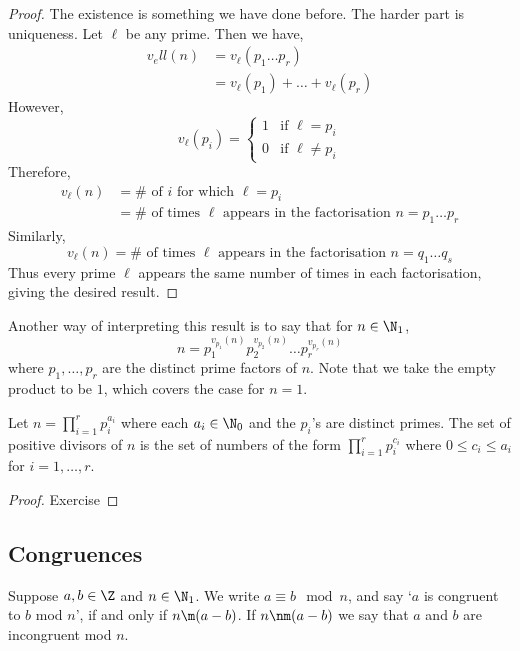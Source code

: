 \begin{proof}
  The existence is something we have done before. The harder part is uniqueness. Let $\ell$ be any prime. Then we have,
  \begin{align*}
    v_ell (n) &= v_\ell (p_1\dots p_r)\\
    &= v_\ell (p_1) + \dots + v_\ell (p_r)
  \end{align*}
  However,
  $$ v_{\ell} (p_i) = \begin{cases}
    1 & \text{if $\ell = p_i$}\\
    0 & \text{if $\ell \ne p_i$}
  \end{cases} $$
  Therefore,
  \begin{align*}
    v_\ell (n) &= \# \text{ of $i$ for which $\ell = p_i$}\\
    &= \# \text{ of times $\ell$ appears in the factorisation $n = p_1\dots p_r$}
  \end{align*}
  Similarly,
  $$ v_\ell (n) = \# \text{ of times $\ell$ appears in the factorisation $n = q_1\dots q_s$} $$
  Thus every prime $\ell$ appears the same number of times in each factorisation, giving the desired result.
\end{proof}


\begin{remark}
  Another way of interpreting this result is to say that for $n \in \N_1$,
  $$ n = p_1^{v_{p_1}(n)}p_2^{v_{p_2}(n)}\dots p_r^{v_{p_r}(n)} $$
  where $p_1, \dots, p_r$ are the distinct prime factors of $n$. Note that we take the empty product to be $1$, which covers the case for $n = 1$.
\end{remark}

\begin{nlemma}
  Let $n = \prod_{i=1}^r p_i^{a_i}$ where each $a_i \in \N_0$ and the $p_i$'s are distinct primes. The set of positive divisors of $n$ is the set of numbers of the form $\prod_{i=1}^r p_i^{c_i}$ where $0 \le c_i \le a_i$ for $i = 1, \dots, r$.
\end{nlemma}
\begin{proof}
  Exercise
\end{proof}

\subsection{Congruences}


\begin{ndefi}[]
  Suppose $a, b \in \Z$ and $n \in \N_1$. We write $a \equiv b \mod n$, and say `$a$ is congruent to $b$ mod $n$', if and only if $n \m (a - b)$. If $n \nm (a - b)$ we say that $a$ and $b$ are incongruent mod $n$.
\end{ndefi}


